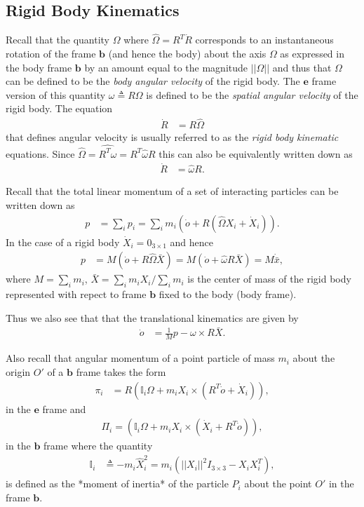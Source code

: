 \documentclass[graybox,envcountchap,sectrefs]{svmonoMuga}
\begin{document}
\subsection{Rigid Body Kinematics}

Recall that the quantity $\Omega$ where $\widehat{\Omega}=R^T\dot{R}$ corresponds to an instantaneous rotation of the frame $\mathbf{b}$ (and hence the body) about the axis $\Omega$ as expressed in the body frame $\mathbf{b}$ by an 
amount equal to the magnitude $||\Omega||$ and thus that $\Omega$ can be defined to be the \textit{body angular velocity} of the rigid body. The $\mathbf{e}$ frame version of this quantity $\omega \triangleq R\Omega$ is defined to be the \textit{spatial angular velocity} of the rigid body.
The equation
\begin{align}
\dot{R}&=R\widehat{\Omega}
\end{align}
that defines angular velocity is usually referred to as the \textit{rigid body kinematic} equations.
Since $\widehat{\Omega}=\widehat{R^T\omega}=R^T\widehat{\omega}R$ this can also be equivalently written down as
\begin{align}
\dot{R}&=\widehat{\omega}R.
\end{align}

Recall that the total linear momentum of a set of interacting particles can be written down as
\begin{align}
p&=\sum_{i}p_i=\sum_{i}m_i\left(\dot{o}+R(\widehat{\Omega}{X}_i+\dot{X}_i)\right).
\end{align}
In the case of a rigid body $\dot{X}_i=0_{3\times 1}$ and hence
\begin{align}
p&=M(\dot{o}+R\widehat{\Omega}\bar{X})=M(\dot{o}+\widehat{\omega}R\bar{X})=M\dot{\bar{x}},
\end{align}
where $M=\sum_{i}m_i$, $\bar{X}=\sum_{i}m_i X_i/\sum_{i}m_i$ is the center of mass of the rigid body represented with repect to frame $\mathbf{b}$ fixed to the body (body frame).

Thus we also see that that the translational kinematics are given by
\begin{align}
\dot{o}&=\frac{1}{M}p-\omega \times R\bar{X}.
\end{align} 

Also recall that angular momentum of a point particle of mass $m_i$ about the origin $O'$ of a $\mathbf{b}$ frame takes the form
\begin{align}
\pi_i&= R\left(\mathbb{I}_i\Omega+m_iX_i\times( R^T\dot{o}+ \dot{X}_i)\right),
\end{align}
in the $\mathbf{e}$ frame and 
\begin{align}
\Pi_i= \left(\mathbb{I}_i\Omega+m_iX_i\times(\dot{X}_i+ R^T\dot{o})\right),
\end{align}
in the $\mathbf{b}$ frame where the quantity
\begin{align}
\mathbb{I}_i &\triangleq -m_i\widehat{X}_i^2=m_i\left(||X_i||^2I_{3\times 3} - X_iX_i^T\right),
\end{align} 
is defined as the *moment of inertia* of the particle $P_i$ about the point $O'$ in the frame $\mathbf{b}$.
\end{document}
